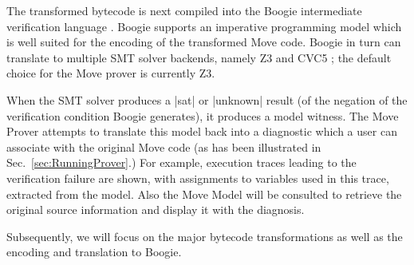 The transformed bytecode is next compiled into the Boogie intermediate
verification language \cite{BOOGIE}. Boogie supports an imperative programming
model which is well suited for the encoding of the transformed Move code. Boogie
in turn can translate to multiple SMT solver backends, namely Z3 \cite{Z3} and
CVC5 \cite{CVC}; the default choice for the Move prover is currently Z3.

When the SMT solver produces a |sat| or |unknown| result (of the negation of the
verification condition Boogie generates), it produces a model witness. The Move
Prover attempts to translate this model back into a diagnostic which
a user can associate with the original Move code (as has been illustrated in
Sec.~\ref{sec:RunningProver}.) For example, execution traces leading to the
verification failure are shown, with assignments to variables used in this
trace, extracted from the model. Also the Move Model will be consulted to
retrieve the original source information and display it with the diagnosis.

Subsequently, we will focus on the major bytecode transformations as well as the
encoding and translation to Boogie.



